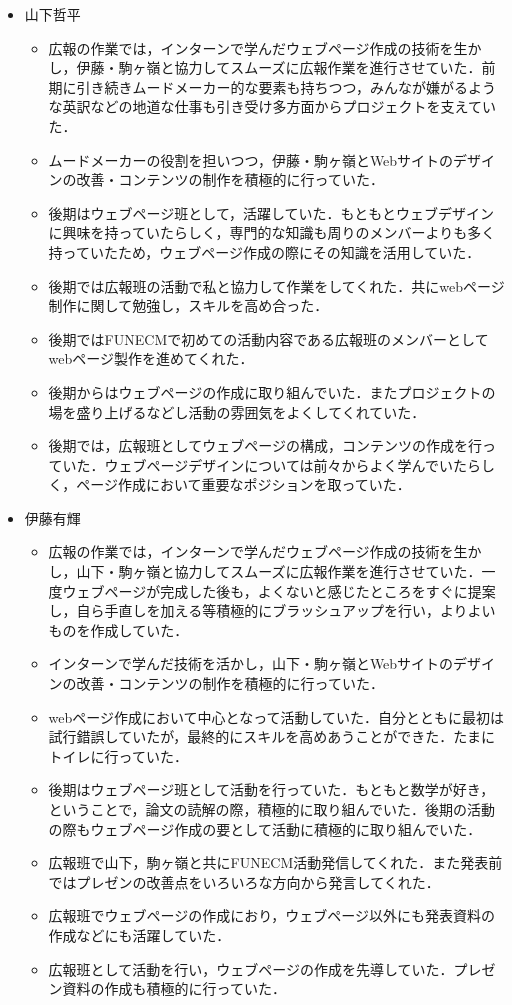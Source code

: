 \documentclass[openany,11pt,papersize]{jsbook}
\begin{document}
\begin{itemize}
\item 山下哲平
\begin{itemize}
\item 広報の作業では，インターンで学んだウェブページ作成の技術を生かし，伊藤・駒ヶ嶺と協力してスムーズに広報作業を進行させていた．前期に引き続きムードメーカー的な要素も持ちつつ，みんなが嫌がるような英訳などの地道な仕事も引き受け多方面からプロジェクトを支えていた．
\item ムードメーカーの役割を担いつつ，伊藤・駒ヶ嶺とWebサイトのデザインの改善・コンテンツの制作を積極的に行っていた．
\item 後期はウェブページ班として，活躍していた．もともとウェブデザインに興味を持っていたらしく，専門的な知識も周りのメンバーよりも多く持っていたため，ウェブページ作成の際にその知識を活用していた．
\item 後期では広報班の活動で私と協力して作業をしてくれた．共にwebページ制作に関して勉強し，スキルを高め合った．
\item 後期ではFUNECMで初めての活動内容である広報班のメンバーとしてwebページ製作を進めてくれた．
\item 後期からはウェブページの作成に取り組んでいた．またプロジェクトの場を盛り上げるなどし活動の雰囲気をよくしてくれていた．
\item 後期では，広報班としてウェブページの構成，コンテンツの作成を行っていた．ウェブページデザインについては前々からよく学んでいたらしく，ページ作成において重要なポジションを取っていた．
\end{itemize}

\item 伊藤有輝
\begin{itemize}
\item 広報の作業では，インターンで学んだウェブページ作成の技術を生かし，山下・駒ヶ嶺と協力してスムーズに広報作業を進行させていた．一度ウェブページが完成した後も，よくないと感じたところをすぐに提案し，自ら手直しを加える等積極的にブラッシュアップを行い，よりよいものを作成していた．
\item インターンで学んだ技術を活かし，山下・駒ヶ嶺とWebサイトのデザインの改善・コンテンツの制作を積極的に行っていた．
\item webページ作成において中心となって活動していた．自分とともに最初は試行錯誤していたが，最終的にスキルを高めあうことができた．たまにトイレに行っていた．
\item 後期はウェブページ班として活動を行っていた．もともと数学が好き，ということで，論文の読解の際，積極的に取り組んでいた．後期の活動の際もウェブページ作成の要として活動に積極的に取り組んでいた．
\item 広報班で山下，駒ヶ嶺と共にFUNECM活動発信してくれた．また発表前ではプレゼンの改善点をいろいろな方向から発言してくれた．
\item 広報班でウェブページの作成におり，ウェブページ以外にも発表資料の作成などにも活躍していた．
\item 広報班として活動を行い，ウェブページの作成を先導していた．プレゼン資料の作成も積極的に行っていた．
\end{itemize}


\end{itemize}
\end{document}
